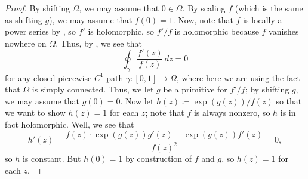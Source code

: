 \documentclass[notes.tex]{subfiles}
\begin{document}
\begin{proof}
	By shifting $\Omega$, we may assume that $0\in\Omega$. By scaling $f$ (which is the same as shifting $g$), we may assume that $f(0)=1$. Now, note that $f$ is locally a power series by , so $f'$ is holomorphic, so $f'/f$ is holomorphic because $f$ vanishes nowhere on $\Omega$. Thus, by , we see that
	\[\oint_\gamma\frac{f'(z)}{f(z)}\,dz=0\]
	for any closed piecewise $C^1$ path $\gamma\colon[0,1]\to\Omega$, where here we are using the fact that $\Omega$ is simply connected. Thus, we let $g$ be a primitive for $f'/f$; by shifting $g$, we may assume that $g(0)=0$. Now let $h(z)\coloneqq\exp(g(z))/f(z)$ so that we want to show $h(z)=1$ for each $z$; note that $f$ is always nonzero, so $h$ is in fact holomorphic. Well, we see that
	\[h'(z)=\frac{f(z)\cdot\exp(g(z))g'(z)-\exp(g(z))f'(z)}{f(z)^2}=0,\]
	so $h$ is constant. But $h(0)=1$ by construction of $f$ and $g$, so $h(z)=1$ for each $z$.
\end{proof}
\end{document}
